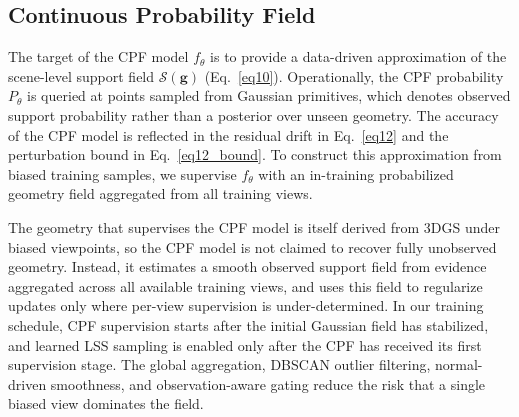 \documentclass[lettersize,journal]{IEEEtran}
\begin{document}
\subsection{Continuous Probability Field}\label{sec:cpf}

The target of the CPF model $f_{\theta}$ is to provide 
a data-driven approximation of the scene-level support field $\mathcal{S}(\mathbf{g})$ (Eq.~\ref{eq10}).
{Operationally, the CPF probability $P_{\theta}$ is queried at points sampled from Gaussian primitives, which denotes observed support probability rather than a posterior over unseen geometry.}
The accuracy of the CPF model is reflected in the residual drift in Eq.~\ref{eq12} and the perturbation bound in Eq.~\ref{eq12_bound}.
To construct this approximation from biased training samples, we supervise $f_{\theta}$ with an in-training probabilized geometry field aggregated from all training views.

The geometry that supervises the CPF model is itself derived from 3DGS under biased viewpoints, so the CPF model is not claimed to recover fully unobserved geometry. Instead, it estimates a smooth observed support field from evidence aggregated across all available training views, and uses this field to regularize updates only where per-view supervision is under-determined. In our training schedule, CPF supervision starts after the initial Gaussian field has stabilized, and learned LSS sampling is enabled only after the CPF has received its first supervision stage. The global aggregation, DBSCAN outlier filtering, normal-driven smoothness, and observation-aware gating reduce the risk that a single biased view dominates the field.
\end{document}
